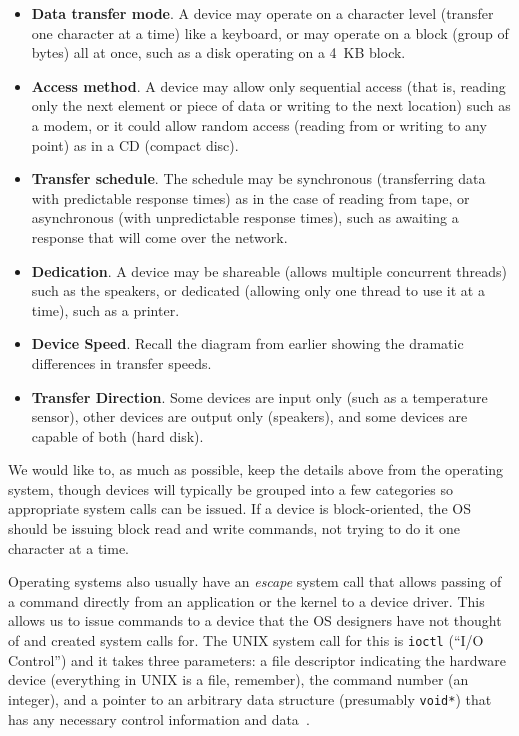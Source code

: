 \begin{itemize}
\item \textbf{Data transfer mode}. A device may operate on a character level (transfer one character at a time) like a keyboard, or may operate on a block (group of bytes) all at once, such as a disk operating on a 4~KB block.
\item \textbf{Access method}. A device may allow only sequential access (that is, reading only the next element or piece of data or writing to the next location) such as a modem, or it could allow random access (reading from or writing to any point) as in a CD (compact disc). 
\item \textbf{Transfer schedule}. The schedule may be synchronous (transferring data with predictable response times) as in the case of reading from tape, or asynchronous (with unpredictable response times), such as awaiting a response that will come over the network.
\item \textbf{Dedication}. A device may be shareable (allows multiple concurrent threads) such as the speakers, or dedicated (allowing only one thread to use it at a time), such as a printer.
\item \textbf{Device Speed}. Recall the diagram from earlier showing the dramatic differences in transfer speeds.
\item \textbf{Transfer Direction}. Some devices are input only (such as a temperature sensor), other devices are output only (speakers), and some devices are capable of both (hard disk).
\end{itemize}

We would like to, as much as possible, keep the details above from the operating system, though devices will typically be grouped into a few categories so appropriate system calls can be issued. If a device is block-oriented, the OS should be issuing block read and write commands, not trying to do it one character at a time.

Operating systems also usually have an \textit{escape} system call that allows passing of a command directly from an application or the kernel to a device driver. This allows us to issue commands to a device that the OS designers have not thought of and created system calls for. The UNIX system call for this is \texttt{ioctl} (``I/O Control'') and it takes three parameters: a file descriptor indicating the hardware device (everything in UNIX is a file, remember), the command number (an integer), and a pointer to an arbitrary data structure (presumably \texttt{void*}) that has any necessary control information and data~\cite{osc}.

